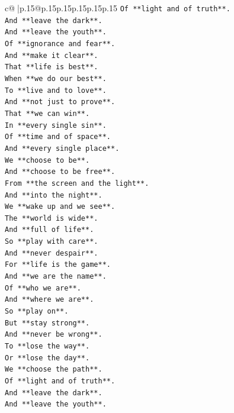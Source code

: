 \documentclass{article}
\begin{document}
{\begin{supertabular}{c@{$\;$}|p{.15\linewidth}@{}p{.15\linewidth}p{.15\linewidth}p{.15\linewidth}p{.15\linewidth}p{.15\linewidth}}
{{{\texttt{Of **light and of truth**.} \\
\texttt{And **leave the dark**.} \\
\texttt{And **leave the youth**.} \\
\texttt{Of **ignorance and fear**.} \\
\texttt{And **make it clear**.} \\
\texttt{That **life is best**.} \\
\texttt{When **we do our best**.} \\
\texttt{To **live and to love**.} \\
\texttt{And **not just to prove**.} \\
\texttt{That **we can win**.} \\
\texttt{In **every single sin**.} \\
\texttt{Of **time and of space**.} \\
\texttt{And **every single place**.} \\
\texttt{We **choose to be**.} \\
\texttt{And **choose to be free**.} \\
\texttt{From **the screen and the light**.} \\
\texttt{And **into the night**.} \\
\texttt{We **wake up and we see**.} \\
\texttt{The **world is wide**.} \\
\texttt{And **full of life**.} \\
\texttt{So **play with care**.} \\
\texttt{And **never despair**.} \\
\texttt{For **life is the game**.} \\
\texttt{And **we are the name**.} \\
\texttt{Of **who we are**.} \\
\texttt{And **where we are**.} \\
\texttt{So **play on**.} \\
\texttt{But **stay strong**.} \\
\texttt{And **never be wrong**.} \\
\texttt{To **lose the way**.} \\
\texttt{Or **lose the day**.} \\
\texttt{We **choose the path**.} \\
\texttt{Of **light and of truth**.} \\
\texttt{And **leave the dark**.} \\
\texttt{And **leave the youth**.} \\
}}}
\end{supertabular}}
\end{document}
